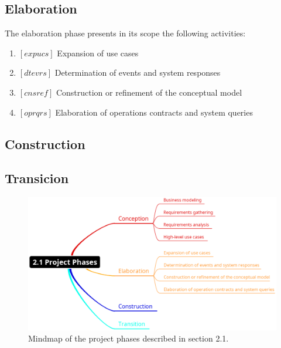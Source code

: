 \documentclass[11pt, twoside, a4paper]{book}
\begin{document}
				\subsection{Elaboration}
				
					The elaboration phase presents in its scope the following activities:
					
					\begin{enumerate}
						\item $[expucs]$ Expansion of use cases								
						\item $[dtevrs]$ Determination of events and system responses
						\item $[cnsref]$ Construction or refinement of the conceptual model
						\item $[oprqrs]$ Elaboration of operations contracts and system queries
					\end{enumerate}
					
				\subsection{Construction}
										
				\subsection{Transicion}

				\begin{figure}[!ht]
					\centering
  					\includegraphics[scale=0.4]{2-1_Project_Phases.eps}
					\caption{Mindmap of the project phases described in section 2.1.}
				\end{figure}
\end{document}
